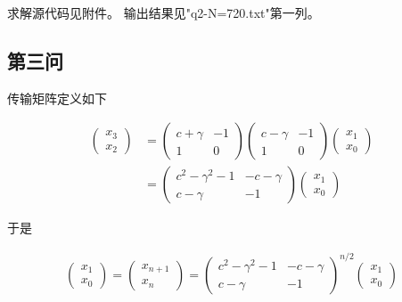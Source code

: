 \documentclass[10pt, a4paper]{article}
\begin{document}
    求解源代码见附件。
    输出结果见"q2-N=720.txt"第一列。

    \subsection{第三问}

    传输矩阵定义如下

    \begin{align*}
        \begin{pmatrix}
            x_3\\
            x_2
        \end{pmatrix}&=
        \begin{pmatrix}
            c+\gamma & -1\\
            1&0
        \end{pmatrix}
        \begin{pmatrix}
            c-\gamma & -1\\
            1&0
        \end{pmatrix}
        \begin{pmatrix}
            x_1\\
            x_0
        \end{pmatrix}\\
        &=
        \begin{pmatrix}
            c^2-\gamma^2-1 & -c-\gamma\\
            c-\gamma&-1
        \end{pmatrix}
        \begin{pmatrix}
            x_1\\
            x_0
        \end{pmatrix}
    \end{align*}

    于是

    \begin{align*}
        \begin{pmatrix}
            x_1\\
            x_0
        \end{pmatrix}
        =
        \begin{pmatrix}
            x_{n+1}\\
            x_n
        \end{pmatrix}
        =
        \begin{pmatrix}
            c^2-\gamma^2-1 & -c-\gamma\\
            c-\gamma&-1
        \end{pmatrix}^{n/2}
        \begin{pmatrix}
            x_1\\
            x_0
        \end{pmatrix}
    \end{align*}
\end{document}
